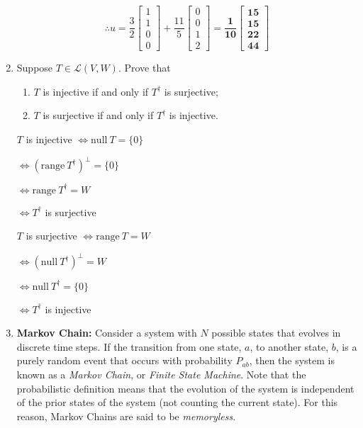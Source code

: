 \documentclass[fleqn]{article}
\begin{document}
\begin{enumerate}[nolistsep]
		\begin{equation*}
			\therefore u = \frac{3}{2}\begin{bmatrix}1\\1\\0\\0\end{bmatrix} + \frac{11}{5}\begin{bmatrix}0\\0\\1\\2\end{bmatrix} = \mathbf{\frac{1}{10}\pmb{\begin{bmatrix}15\\15\\22\\44\end{bmatrix}}}
		\end{equation*}
		
		\item Suppose $T \in \mathcal{L}(V,W)$. Prove that
		
		\begin{enumerate}[nolistsep]
			\item $T$ is injective if and only if $T^\dag$ is surjective;
			\item $T$ is surjective if and only if $T^\dag$ is injective. 
		\end{enumerate}
		
		$T$ is injective $\Leftrightarrow \text{null}\ T = \{0\}$
		
		$\Leftrightarrow (\text{range}\ T^{\dag})^{\perp} = \{0\}$
		
		$\Leftrightarrow \text{range}\ T^{\dag} = W$
		
		$\Leftrightarrow T^{\dag}$ is surjective
		
		$T$ is surjective $\Leftrightarrow \text{range}\ T = W$
		
		$\Leftrightarrow (\text{null}\ T^{\dag})^{\perp} = W$
		
		$\Leftrightarrow \text{null}\ T^{\dag} = \{0\}$
		
		$\Leftrightarrow T^{\dag}$ is injective
		
		\item \textbf{Markov Chain:} Consider a system with $N$ possible states that evolves in discrete time steps. If the transition from one state, $a$, to another state, $b$, is a purely random event that occurs with probability $P_{ab}$, then the system is known as a \textit{Markov Chain}, or \textit{Finite State Machine}. Note that the probabilistic definition means that the evolution of the system is independent of the prior states of the system (not counting the current state). For this reason, Markov Chains are said to be \textit{memoryless}.
		

\end{enumerate}
\end{document}
